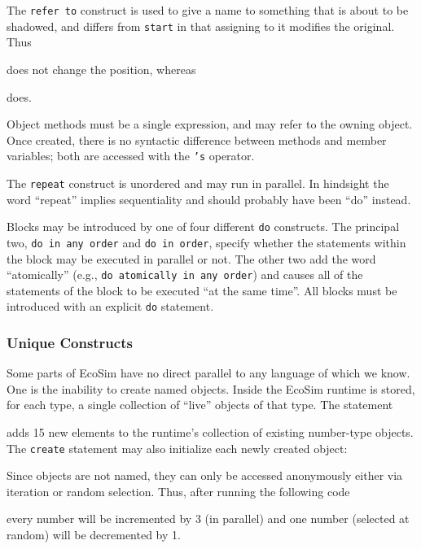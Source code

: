 \documentclass{sig-alternate}
\newcommand{\INDSTATE}[1][1]{\STATE\hspace{#1\algorithmicindent}}
\newenvironment{snippet}{\begin{algorithmic}[1]}{\end{algorithmic}}
\begin{document}
The \texttt{refer to} construct is used to give a name to something that is about to be shadowed,
and differs from \texttt{start} in that assigning to it modifies the original.
Thus 
\begin{snippet}
\end{snippet}
does not change the position, whereas
\begin{snippet}
\end{snippet}
does.

Object methods must be a single expression, and may refer to the owning object.
Once created, there is no syntactic difference between methods and member variables;
both are accessed with the \texttt{'s} operator.

The \texttt{repeat} construct is unordered and may run in parallel.
In hindsight the word ``repeat'' implies sequentiality and should probably have been ``do'' instead.

Blocks may be introduced by one of four different \texttt{do} constructs.
The principal two, \texttt{do in any order} and \texttt{do in order},
specify whether the statements within the block may be executed in parallel or not.
The other two add the word ``atomically'' (e.g., \texttt{do atomically in any order})
and causes all of the statements of the block to be executed ``at the same time''.
All blocks must be introduced with an explicit \texttt{do} statement.

\subsubsection{Unique Constructs}\label{sec:ecosim-unique}
Some parts of EcoSim have no direct parallel to any language of which we know.
One is the inability to create named objects.
Inside the EcoSim runtime is stored, for each type, a single collection of ``live'' objects of that type.
The statement
\begin{snippet}
\end{snippet}
adds 15 new elements to the runtime's collection of existing number-type objects.
The \texttt{create} statement may also initialize each newly created object:
\begin{snippet}
\INDSTATE{replace the number with 7}
\end{snippet}

Since objects are not named, they can only be accessed anonymously
either via iteration or random selection.
Thus, after running the following code
\begin{snippet}
\INDSTATE{replace the number with the old number + 3}
\INDSTATE{replace the number with the old number -- 1}
\end{snippet}
every number will be incremented by 3 (in parallel)
and one number (selected at random) will be decremented by 1.
\end{document}
